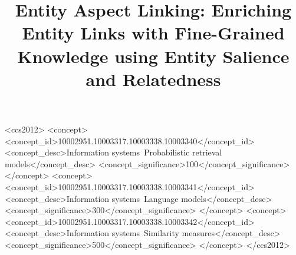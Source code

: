 \documentclass[sigconf,anonymous,review]{acmart}
\begin{document}
%
\title[Entity Aspect Linking]{Entity Aspect Linking: Enriching Entity Links with Fine-Grained Knowledge using Entity Salience and Relatedness}

%

%

%


\begin{CCSXML}
<ccs2012>
   <concept>
       <concept_id>10002951.10003317.10003338.10003340</concept_id>
       <concept_desc>Information systems~Probabilistic retrieval models</concept_desc>
       <concept_significance>100</concept_significance>
       </concept>
   <concept>
       <concept_id>10002951.10003317.10003338.10003341</concept_id>
       <concept_desc>Information systems~Language models</concept_desc>
       <concept_significance>300</concept_significance>
       </concept>
   <concept>
       <concept_id>10002951.10003317.10003338.10003342</concept_id>
       <concept_desc>Information systems~Similarity measures</concept_desc>
       <concept_significance>500</concept_significance>
       </concept>
 </ccs2012>
\end{CCSXML}

\end{document}
